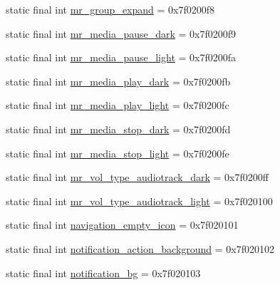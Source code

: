 \begin{CompactItemize}
static final int \hyperlink{classandroid_1_1support_1_1graphics_1_1drawable_1_1animated_1_1_r_1_1drawable_75e0694075a31802acf8325331b1ac5d}{mr\_\-group\_\-expand} = 0x7f0200f8
\item 
static final int \hyperlink{classandroid_1_1support_1_1graphics_1_1drawable_1_1animated_1_1_r_1_1drawable_acc80e40f7c0dbb86e62a159c13c9f04}{mr\_\-media\_\-pause\_\-dark} = 0x7f0200f9
\item 
static final int \hyperlink{classandroid_1_1support_1_1graphics_1_1drawable_1_1animated_1_1_r_1_1drawable_8f35da11038f4563c3fd145a5fe5d484}{mr\_\-media\_\-pause\_\-light} = 0x7f0200fa
\item 
static final int \hyperlink{classandroid_1_1support_1_1graphics_1_1drawable_1_1animated_1_1_r_1_1drawable_de2c6dc0174fd4c89da8a1bf9a22b776}{mr\_\-media\_\-play\_\-dark} = 0x7f0200fb
\item 
static final int \hyperlink{classandroid_1_1support_1_1graphics_1_1drawable_1_1animated_1_1_r_1_1drawable_13445f189f419121db199c03466dbedb}{mr\_\-media\_\-play\_\-light} = 0x7f0200fc
\item 
static final int \hyperlink{classandroid_1_1support_1_1graphics_1_1drawable_1_1animated_1_1_r_1_1drawable_8161f003e4a1fa1021f6b4c087c4a7ca}{mr\_\-media\_\-stop\_\-dark} = 0x7f0200fd
\item 
static final int \hyperlink{classandroid_1_1support_1_1graphics_1_1drawable_1_1animated_1_1_r_1_1drawable_71e1fa206be5af939d343cffc3f33fb4}{mr\_\-media\_\-stop\_\-light} = 0x7f0200fe
\item 
static final int \hyperlink{classandroid_1_1support_1_1graphics_1_1drawable_1_1animated_1_1_r_1_1drawable_ce434de0f1589bee26734163719baca0}{mr\_\-vol\_\-type\_\-audiotrack\_\-dark} = 0x7f0200ff
\item 
static final int \hyperlink{classandroid_1_1support_1_1graphics_1_1drawable_1_1animated_1_1_r_1_1drawable_6e2b7fdce294ac57f8027be7e848fdfe}{mr\_\-vol\_\-type\_\-audiotrack\_\-light} = 0x7f020100
\item 
static final int \hyperlink{classandroid_1_1support_1_1graphics_1_1drawable_1_1animated_1_1_r_1_1drawable_9b8f6ebaab2336c413dd48d1af77cb13}{navigation\_\-empty\_\-icon} = 0x7f020101
\item 
static final int \hyperlink{classandroid_1_1support_1_1graphics_1_1drawable_1_1animated_1_1_r_1_1drawable_fd3a2cef18db3f8cf174bf86d7894d6b}{notification\_\-action\_\-background} = 0x7f020102
\item 
static final int \hyperlink{classandroid_1_1support_1_1graphics_1_1drawable_1_1animated_1_1_r_1_1drawable_5e593749e89a60cd596515c380e2626b}{notification\_\-bg} = 0x7f020103

\end{CompactItemize}
